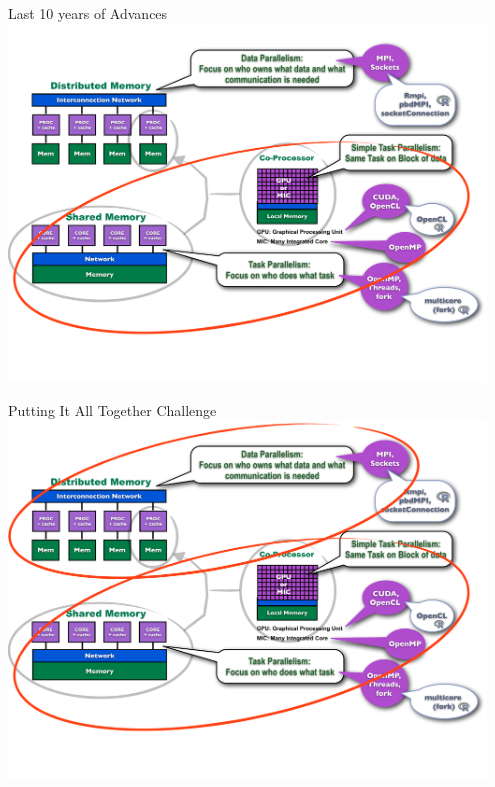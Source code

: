 \begin{frame}
\begin{block}{Last 10 years of Advances}
    \includegraphics[width=0.95\textwidth]{../common/pics/ParallelHardware9.pdf}
\end{block}
\end{frame}

\begin{frame}
\begin{block}{Putting It All Together Challenge}
    \includegraphics[width=0.95\textwidth]{../common/pics/ParallelHardware10.pdf}
\end{block}
\end{frame}

